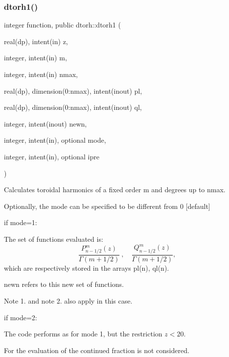 \subsubsection{\texorpdfstring{dtorh1()}{dtorh1()}}
{\footnotesize\ttfamily integer function, public dtorh\+::dtorh1 (\begin{DoxyParamCaption}\item[{real(dp), intent(in)}]{z,  }\item[{integer, intent(in)}]{m,  }\item[{integer, intent(in)}]{nmax,  }\item[{real(dp), dimension(0\+:nmax), intent(inout)}]{pl,  }\item[{real(dp), dimension(0\+:nmax), intent(inout)}]{ql,  }\item[{integer, intent(inout)}]{newn,  }\item[{integer, intent(in), optional}]{mode,  }\item[{integer, intent(in), optional}]{ipre }\end{DoxyParamCaption})}



Calculates toroidal harmonics of a fixed order {\ttfamily m} and degrees up to {\ttfamily nmax}. 

Optionally, the {\ttfamily mode} can be specified to be different from 0 \mbox{[}default\mbox{]}
\begin{DoxyItemize}
\item if {\ttfamily mode=1}\+:
\begin{DoxyItemize}
\item The set of functions evaluated is\+: \[\frac{P_{n-1/2}^m \left(z\right)}{\Gamma(m+1/2)} \ ,\quad \frac{Q_{n-1/2}^m \left(z\right)}{\Gamma(m+1/2)},\] which are respectively stored in the arrays {\ttfamily pl(n)}, {\ttfamily ql(n)}.
\item newn refers to this new set of functions.
\item Note 1. and note 2. also apply in this case.
\end{DoxyItemize}
\item if {\ttfamily mode=2}\+:
\begin{DoxyItemize}
\item The code performs as for mode 1, but the restriction $ z<20 $.
\item For the evaluation of the continued fraction is not considered.
\end{DoxyItemize}
\end{DoxyItemize}

